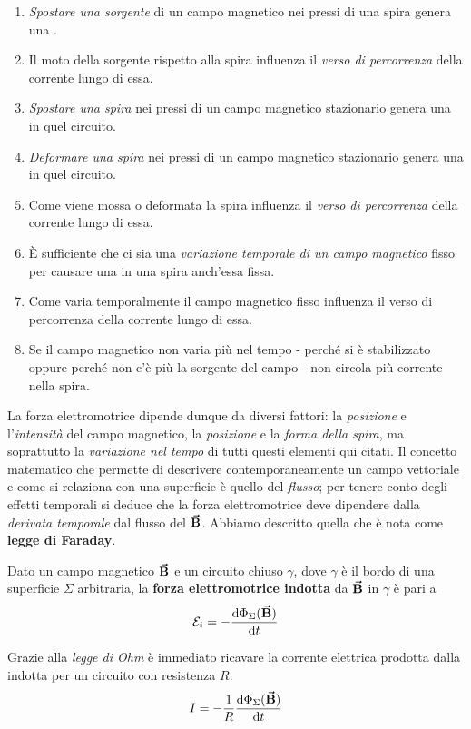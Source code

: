 \begin{enumerate}[label=\alph*)]\label{osservazioniFaraday} %
	\item \textit{Spostare una sorgente} di un campo magnetico nei pressi di una spira genera una \fem.
	\item Il moto della sorgente rispetto alla spira influenza il \textit{verso di percorrenza} della corrente lungo di essa.
	\item \textit{Spostare una spira} nei pressi di un campo magnetico stazionario genera una \fem in quel circuito.
	\item \textit{Deformare una spira} nei pressi di un campo magnetico stazionario genera una \fem in quel circuito.
	\item Come viene mossa o deformata la spira influenza il \textit{verso di percorrenza} della corrente lungo di essa.
	\item È sufficiente che ci sia una \textit{variazione temporale di un campo magnetico} fisso per causare una \fem in una spira anch'essa fissa.
	\item Come varia temporalmente il campo magnetico fisso influenza il verso di percorrenza della corrente lungo di essa.
	\item Se il campo magnetico non varia più nel tempo - perché si è stabilizzato oppure perché non c'è più la sorgente del campo - non circola più corrente nella spira.
\end{enumerate}
La forza elettromotrice dipende dunque da diversi fattori: la \textit{posizione} e l'\textit{intensità} del campo magnetico, la \textit{posizione} e la \textit{forma della spira}, ma soprattutto la \textit{variazione nel tempo} di tutti questi elementi qui citati.
Il concetto matematico che permette di descrivere contemporaneamente un campo vettoriale e come si relaziona con una superficie è quello del \textit{flusso}; per tenere conto degli effetti temporali si deduce che la forza elettromotrice deve dipendere dalla \textit{derivata temporale} dal flusso del $\vb*{\va{B}}$. Abbiamo descritto quella che è nota come \textbf{legge di Faraday}.
\begin{theorema}
	Dato un campo magnetico $\vb*{\va{B}}$ e un circuito chiuso $\gamma$, dove $\gamma$ è il bordo di una superficie $\Sigma$ arbitraria, la \textbf{forza elettromotrice indotta} da $\vb*{\va{B}}$ in $\gamma$ è pari a
	\begin{equation}
		\mathcal{E}_i=-\dv{\Phi_\Sigma (\vb*{\va{B}})}{t}
	\end{equation}
\end{theorema}
Grazie alla \textit{legge di Ohm} è immediato ricavare la corrente elettrica prodotta dalla \fem indotta per un circuito con resistenza $R$:
\begin{equation}
	I=-\frac{1}{R}\dv{\Phi_\Sigma(\vb*{\va{B}})}{t}
\end{equation}

